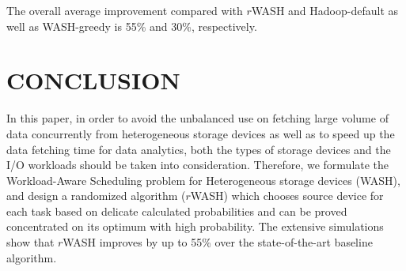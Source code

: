 \documentclass[conference]{IEEEtran}
\begin{document}
The overall average improvement compared with $r$WASH and Hadoop-default as well as WASH-greedy is 55\% and 30\%, respectively.


\section{CONCLUSION}\label{CONCLUSION}
In this paper, in order to avoid the unbalanced use on fetching large volume of data concurrently from heterogeneous storage devices as well as to speed up the data fetching time for data analytics, both the types of storage devices and the I/O workloads should be taken into consideration. Therefore, we formulate the Workload-Aware Scheduling problem for Heterogeneous storage devices (WASH), and design a randomized algorithm ($r$WASH) which chooses source device for each task based on delicate calculated probabilities and can be proved concentrated on its optimum with high probability. The extensive simulations show that $r$WASH improves by up to 55\% over the state-of-the-art baseline algorithm.
\end{document}
